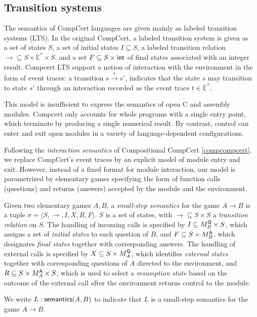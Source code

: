 
\subsection{Transition systems} %
\label{sec:lts}

The semantics of CompCert languages are given mainly
as labeled transition systems (LTS).
In the original CompCert,
a labeled transition system is given as
a set of states $S$,
a set of initial states
$I \subseteq S$,
a labeled transition relation
${\rightarrow} \subseteq S \times \mathbb{E}^* \times S$,
and a set
$F \subseteq S \times  \mathsf{int} $
of final states associated with an integer result.
Compcert LTS support a notion of interaction with the environment
in the form of event traces:
a transition $s \stackrel{t}{\rightarrow} s'$,
indicates that the state $s$ may transition to state $s'$
through an interaction recorded as the event trace $t \in \mathbb{E}^*$.

This model is insufficient to express
the semantics of open C and assembly modules.
Compcert only accounts for
whole programs with a single entry point,
which terminate by producing a single numerical result.
By contrast,
control can enter and exit open modules
in a variety of language-dependent configurations.

Following the \emph{interaction semantics} of
Compositional CompCert \ref{compcompcert},
we replace CompCert's event traces
by an explicit model of module entry and exit.
However,
instead of a fixed format for module interaction,
our model is parametrized by elementary games
specifying the form of function calls (questions)
and returns (answers) accepted by the module and the environment.

\begin{definition}
Given two elementary games $A, B$,
a \emph{small-step semantics} for the game $A \rightarrow B$
is a tuple $\sigma = \langle S, \rightarrow, I, X, R, F \rangle$.
$S$ is a set of states,
with ${\rightarrow} \subseteq S \times S$ a \emph{transition relation} on $S$.
The handling of incoming calls is specified by
$I \subseteq M_B^{ \mathsf{Q} } \times S$, which
assigns a set of \emph{initial states} to each question of $B$, and
$F \subseteq S \times M_B^{ \mathsf{A} }$,
which designates \emph{final states} together with corresponding answers.
The handling of external calls is specified by
$X \subseteq S \times M_A^{ \mathsf{Q} }$,
which identifies \emph{external states} together with
corresponding questions of $A$ directed to the environment, and
$R \subseteq S \times M_A^{ \mathsf{A} } \times S$,
which is used to select a \emph{resumption state}
based on the outcome of the external call
after the environment returns control to the module.

We write $L :  \mathsf{semantics} (A, B)$ to indicate that
$L$ is a small-step semantics for the game $A \rightarrow B$.
\end{definition}

